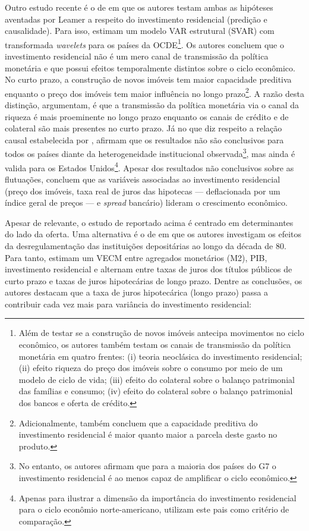 Outro estudo recente é o de \textcite{huang_is_2018} em que os autores testam ambas as hipóteses aventadas por Leamer a respeito do investimento residencial (predição e causalidade). Para isso, estimam um modelo VAR estrutural (SVAR) com transformada \textit{wavelets} para os países da OCDE\footnote{
	Além de testar se a construção de novos imóveis antecipa movimentos no ciclo econômico, os autores também testam os canais de transmissão da política monetária em quatro frentes: (i) teoria neoclásica do investimento residencial; (ii) efeito riqueza do preço dos imóveis sobre o consumo por meio de um modelo de ciclo de vida; (iii) efeito do colateral sobre o balanço patrimonial das famílias e consumo; (iv) efeito do colateral sobre o balanço patrimonial dos bancos e oferta de crédito.}.  
Os autores concluem que o investimento residencial não é um mero canal de transmissão da política monetária e que possui efeitos temporalmente distintos sobre o ciclo econômico. No curto prazo, a construção de novos imóveis tem maior capacidade preditiva enquanto o preço dos imóveis tem maior influência no longo prazo\footnote{Adicionalmente, \textcite{huang_is_2018} também concluem que a capacidade preditiva do investimento residencial é maior quanto maior a parcela deste gasto no produto.}. A razão desta distinção, argumentam, é que a transmissão da política monetária via o canal da riqueza é mais proeminente no longo prazo enquanto os canais de crédito e de colateral são mais presentes no curto prazo. Já no que diz respeito a relação causal estabelecida por \textcite{leamer_housing_2007}, afirmam que os resultados não são conclusivos para todos os países diante da heterogeneidade institucional observada\footnote{
	No entanto, os autores afirmam que para a maioria dos países do G7 o investimento residencial é ao menos capaz de amplificar o ciclo econômico.}, mas ainda é valida para os Estados Unidos\footnote{
	Apenas para ilustrar a dimensão da importância do investimento residencial para o ciclo econômio norte-americano, \textcite{huang_is_2018} utilizam este pais como critério de comparação.}.
Apesar dos resultados não conclusivos sobre as flutuações, concluem que as variáveis associadas ao investimento residencial (preço dos imóveis, taxa real de juros das hipotecas --- deflacionada por um índice geral de preços --- e \textit{spread} bancário) lideram o crescimento econômico.

Apesar de relevante, o estudo  de \textcite{huang_is_2018} reportado acima é centrado em determinantes do lado da oferta.
Uma alternativa é o de \textcite{gauger_residential_2003} em que os autores investigam os efeitos da desregulamentação das instituições depositárias ao longo da década de 80. Para tanto, estimam um VECM entre agregados monetários (M2), PIB, investimento residencial e alternam entre taxas de juros dos títulos públicos  de curto prazo e taxas de juros hipotecárias de longo prazo.
Dentre as conclusões, os autores destacam que a taxa de juros hipotecárica (longo prazo) passa a contribuir cada vez mais para variância do investimento residencial:

